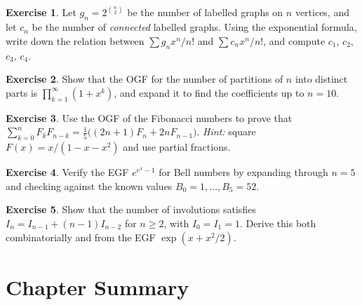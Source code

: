 \documentclass[12pt,a4paper,openany]{book}
\theoremstyle{definition}
\newtheorem{exercise}{Exercise}[chapter]
\theoremstyle{plain}
\theoremstyle{remark}
\begin{document}
\begin{exercise}\label{exo:egf-connected-graphs}
Let $g_n = 2^{\binom{n}{2}}$ be the number of labelled graphs on $n$
vertices, and let $c_n$ be the number of \emph{connected} labelled
graphs.  Using the exponential formula, write down the relation between
$\sum g_n x^n/n!$ and $\sum c_n x^n/n!$, and compute $c_1$, $c_2$,
$c_3$, $c_4$.
\end{exercise}

\begin{exercise}\label{exo:ogf-partition-distinct}
Show that the OGF for the number of partitions of $n$ into distinct
parts is $\prod_{k=1}^{\infty}(1+x^k)$, and expand it to find the
coefficients up to $n = 10$.
\end{exercise}

\begin{exercise}\label{exo:fibonacci-convolution}
Use the OGF of the Fibonacci numbers to prove that
$\sum_{k=0}^{n}F_k F_{n-k} = \frac{1}{5}\bigl((2n+1)F_n +
2nF_{n-1}\bigr)$.
\textit{Hint:} square $F(x) = x/(1-x-x^2)$ and use partial fractions.
\end{exercise}

\begin{exercise}\label{exo:bell-egf-verify}
Verify the EGF $e^{e^x-1}$ for Bell numbers by expanding through $n=5$
and checking against the known values $B_0 = 1, \dots, B_5 = 52$.
\end{exercise}

\begin{exercise}\label{exo:involution-recurrence}
Show that the number of involutions satisfies $I_n = I_{n-1}+(n-1)I_{n-2}$
for $n \ge 2$, with $I_0 = I_1 = 1$.  Derive this both combinatorially
and from the EGF $\exp(x+x^2/2)$.
\end{exercise}



\section{Chapter Summary}\label{sec:gf-summary}
\end{document}
